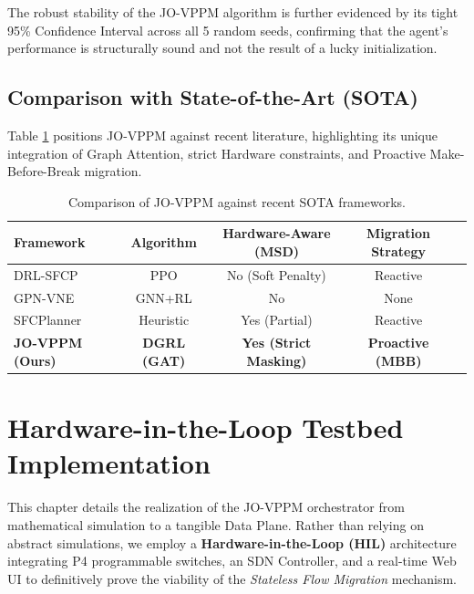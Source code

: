 The robust stability of the JO-VPPM algorithm is further evidenced by its tight 95\% Confidence Interval across all 5 random seeds, confirming that the agent's performance is structurally sound and not the result of a lucky initialization.

\section{Comparison with State-of-the-Art (SOTA)}
Table \ref{table:sota_compare} positions JO-VPPM against recent literature, highlighting its unique integration of Graph Attention, strict Hardware constraints, and Proactive Make-Before-Break migration.

\begin{table}[H]
\centering
\caption{Comparison of JO-VPPM against recent SOTA frameworks.}
\label{table:sota_compare}
\begin{tabular}{lcccc}
\toprule
\textbf{Framework} & \textbf{Algorithm} & \textbf{Hardware-Aware (MSD)} & \textbf{Migration Strategy} \\
\midrule
DRL-SFCP \cite{wang2021drl} & PPO & No (Soft Penalty) & Reactive \\
GPN-VNE \cite{pei2025graph} & GNN+RL & No & None \\
SFCPlanner \cite{qiu2024sfcplanner} & Heuristic & Yes (Partial) & Reactive \\
\textbf{JO-VPPM (Ours)} & \textbf{DGRL (GAT)} & \textbf{Yes (Strict Masking)} & \textbf{Proactive (MBB)} \\
\bottomrule
\end{tabular}
\end{table}


\chapter{Hardware-in-the-Loop Testbed Implementation}
\label{chap:testbed}

This chapter details the realization of the JO-VPPM orchestrator from mathematical simulation to a tangible Data Plane. Rather than relying on abstract simulations, we employ a \textbf{Hardware-in-the-Loop (HIL)} architecture integrating P4 programmable switches, an SDN Controller, and a real-time Web UI to definitively prove the viability of the \textit{Stateless Flow Migration} mechanism.

